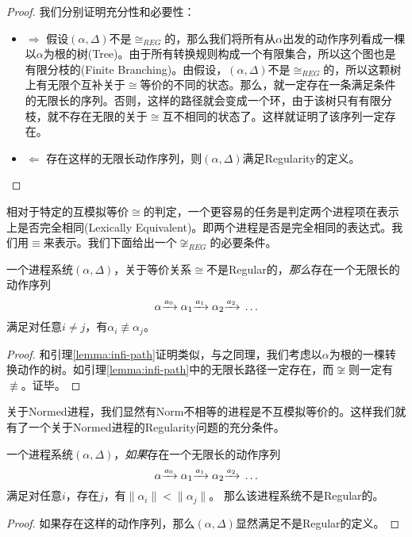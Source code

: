 \begin{proof}
我们分别证明充分性和必要性：
\begin{itemize}
	\item $\Rightarrow$ 假设$(\alpha,\Delta)$不是$\cong_{REG}$的，那么我们将所有从$\alpha$出发的动作序列看成一棵以$\alpha$为根的树(Tree)。由于所有转换规则构成一个有限集合，所以这个图也是有限分枝的(Finite Branching)。由假设，$(\alpha,\Delta)$不是$\cong_{REG}$的，所以这颗树上有无限个互补关于$\cong$等价的不同的状态。那么，就一定存在一条满足条件的无限长的序列。否则，这样的路径就会变成一个环，由于该树只有有限分枝，就不存在无限的关于$\cong$互不相同的状态了。这样就证明了该序列一定存在。
	\item $\Leftarrow$ 存在这样的无限长动作序列，则$(\alpha,\Delta)$满足Regularity的定义。
\end{itemize}
\end{proof}

相对于特定的互模拟等价$\cong$的判定，一个更容易的任务是判定两个进程项在表示上是否完全相同(Lexically Equivalent)。即两个进程是否是完全相同的表达式。我们用$\equiv$来表示。我们下面给出一个$\not\cong_{REG}$的必要条件。

\begin{lem}\label{lemma:infi-path-2}
一个进程系统$(\alpha,\Delta)$，关于等价关系$\cong$不是Regular的，\emph{那么}存在一个无限长的动作序列
$$\alpha{\xrightarrow{a_0}{}}\alpha_1{\xrightarrow{a_1}{}}\alpha_2{\xrightarrow{a_2}{}}\ldots$$ 
满足对任意$i\neq j$，有$\alpha_i\not\equiv\alpha_j$。
\end{lem}

\begin{proof}
和引理\ref{lemma:infi-path}证明类似，与之同理，我们考虑以$\alpha$为根的一棵转换动作的树。如引理\ref{lemma:infi-path}中的无限长路径一定存在，而$\not\cong$则一定有$\not\equiv$。证毕。
\end{proof}

关于Normed进程，我们显然有Norm不相等的进程是不互模拟等价的。这样我们就有了一个关于Normed进程的Regularity问题的充分条件。

\begin{lem}\label{lamma:infi-path-3}
一个进程系统$(\alpha,\Delta)$，\emph{如果}存在一个无限长的动作序列
$$\alpha{\xrightarrow{a_0}{}}\alpha_1{\xrightarrow{a_1}{}}\alpha_2{\xrightarrow{a_2}{}}\ldots$$ 
满足对任意$i$，存在$j$，有$\|\alpha_i\|<\|\alpha_j\|$。
那么该进程系统不是Regular的。
\end{lem}

\begin{proof}
如果存在这样的动作序列，那么$(\alpha,\Delta)$显然满足不是Regular的定义。
\end{proof}

